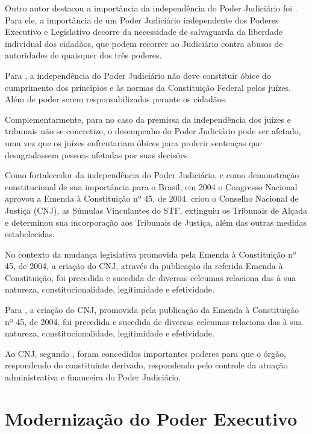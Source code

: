 Outro autor destacou a importância da independência do Poder Judiciário foi \cite{akutsu2012dimensoes}. Para ele, a importância de um Poder Judiciário independente dos Poderes Executivo e Legislativo decorre da necessidade de salvaguarda da liberdade individual dos cidadãos, que podem recorrer ao Judiciário contra abusos de autoridades de quaisquer dos três poderes. 

Para \cite{akutsu2012dimensoes}, a independência do Poder Judiciário não deve constituir óbice do cumprimento dos princípios e às normas da Constituição Federal pelos juízes. Além de poder serem responsabilizados perante os cidadãos. 

Complementarmente, para \cite{akutsu2012dimensoes} no caso da premissa da independência dos juízes e tribunais não se concretize, o desempenho do Poder Judiciário pode ser afetado, uma vez que os juízes enfrentariam óbices para  proferir sentenças que desagradassem pessoas afetadas por suas decisões.

Como fortalecedor da independência do Poder Judiciário, e como demonstração constitucional de sua importância para o Brasil, em 2004 o Congresso Nacional aprovou a Emenda à Constituição nº 45, de 2004. \cite{ec45_2004} criou o Conselho Nacional de Justiça (CNJ), as Súmulas Vinculantes do STF, extinguiu os Tribunais de Alçada e determinou sua incorporação aos Tribunais de Justiça, além das outras medidas estabelecidas.

No contexto da mudança legislativa promovida pela  Emenda à Constituição nº 45, de 2004, a criação do CNJ, através da publicação da referida Emenda à Constituição, foi precedida e sucedida de diversas celeumas relaciona das à sua natureza, constitucionalidade, legitimidade e efetividade.

Para \cite{silva2013transparencia}, a criação do CNJ, promovida pela publicação da Emenda à Constituição nº 45, de 2004, foi precedida e sucedida de diversas celeumas relaciona das à sua natureza, constitucionalidade, legitimidade e efetividade.  

Ao CNJ, segundo \cite{silva2013transparencia}, foram concedidos importantes poderes para que o órgão, respondendo do constituinte derivado, respondendo pelo controle da atuação administrativa e financeira do Poder Judiciário.

\section{Modernização do Poder Executivo}   

